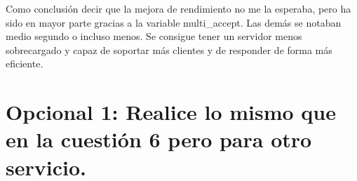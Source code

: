 	Como conclusión decir que la mejora de rendimiento no me la esperaba, pero ha sido en mayor parte gracias a la variable multi\_accept. Las demás se notaban medio segundo o incluso menos. Se consigue tener un servidor menos sobrecargado y capaz de soportar más clientes y de responder de forma más eficiente.
	\section{Opcional 1: Realice lo mismo que en la cuestión 6 pero para otro servicio.}
	
	


	




